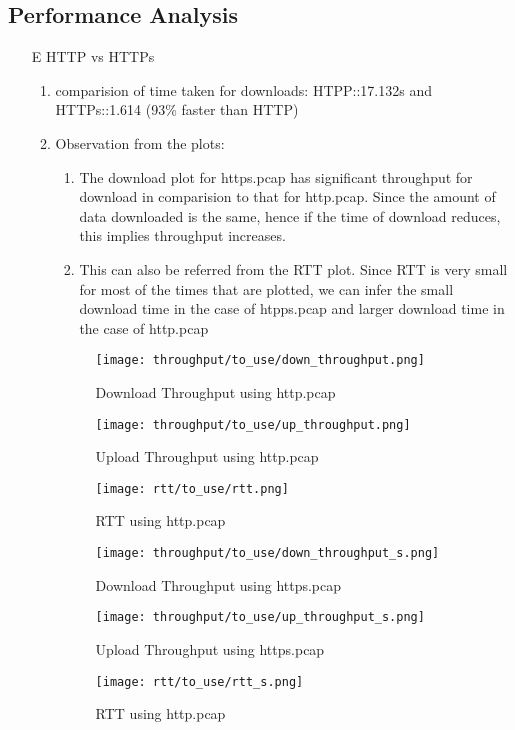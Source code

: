 \documentclass[12pt]{article}
\begin{document}
\subsection{Performance Analysis}
\begin{enumerate}
    \item[E] HTTP vs HTTPs
    \begin{enumerate}
        \item comparision of time taken for downloads: HTPP::17.132s and HTTPs::1.614 (93\% faster than HTTP)
        \item Observation from the plots: 
        \begin{enumerate}
            \item The download plot for https.pcap has significant throughput for download in comparision to that for http.pcap. Since the amount of data downloaded is the same, hence if the time of download reduces, this implies throughput increases.
            \item This can also be referred from the RTT plot. Since RTT is very small for most of the times that are plotted, we can infer the small download time in the case of htpps.pcap and larger download time in the case of http.pcap
        \end{enumerate}
         
        \begin{figure}[h!]
            \centering
            \texttt{[image: throughput/to\_use/down\_throughput.png]}
            \caption{Download Throughput using http.pcap}
        \end{figure}
        \begin{figure}[h!]
            \centering
            \texttt{[image: throughput/to\_use/up\_throughput.png]}
            \caption{Upload Throughput using http.pcap}
        \end{figure}
        \begin{figure}[h!]
            \centering
            \texttt{[image: rtt/to\_use/rtt.png]}
            \caption{RTT using http.pcap}
        \end{figure}
        \begin{figure}[h!]
            \centering
            \texttt{[image: throughput/to\_use/down\_throughput\_s.png]}
            \caption{Download Throughput using https.pcap}
        \end{figure}
        \begin{figure}[h!]
            \centering
            \texttt{[image: throughput/to\_use/up\_throughput\_s.png]}
            \caption{Upload Throughput using https.pcap}
        \end{figure}
        \begin{figure}[h!]
            \centering
            \texttt{[image: rtt/to\_use/rtt\_s.png]}
            \caption{RTT using http.pcap}
        \end{figure}
    \end{enumerate}
    
\end{enumerate}
\end{document}
